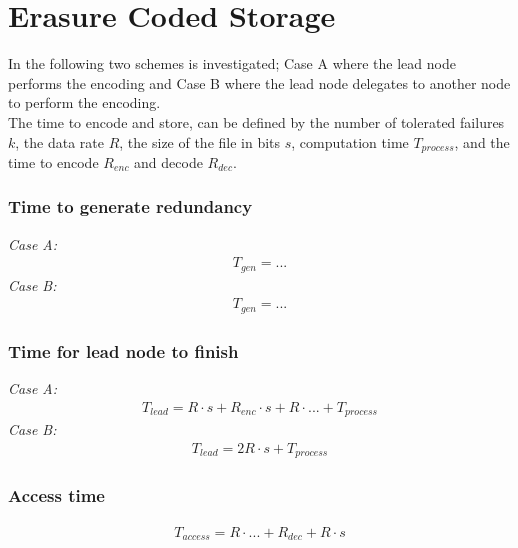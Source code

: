 \section{Erasure Coded Storage} \label{sec:ec}
In the following two schemes is investigated; Case A where the lead node performs the encoding and Case B where the lead node delegates to another node to perform the encoding.\\
The time to encode and store, can be defined by the number of tolerated failures $k$, the data rate $R$, the size of the file in bits $s$, computation time $T_{process}$, and the time to encode $R_{enc}$ and decode $R_{dec}$.

\subsubsection*{Time to generate redundancy}
\textit{Case A:} 
\begin{align}
    T_{gen} = ...
\end{align}
\textit{Case B:} 
\begin{align}
    T_{gen} = ...
\end{align}

\subsubsection*{Time for lead node to finish}
\textit{Case A:} 
\begin{align}
    T_{lead} = R \cdot s + R_{enc} \cdot s + R \cdot ... + T_{process}
\end{align}
\textit{Case B:} 
\begin{align}
    T_{lead} = 2R \cdot s + T_{process}
\end{align}

\subsubsection*{Access time}
\begin{align}
    T_{access} = R \cdot ... + R_{dec} + R \cdot s
\end{align}

